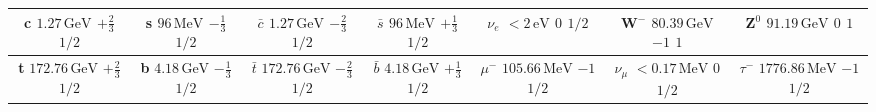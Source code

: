 \documentclass[letterpaper]{article}
\begin{document}
\begin{center}
\begin{tabular}{|c|c|c|c|c|c|c|}
\parbox[c][5em][c]{2cm}{\centering \textbf{c} \\ $1.27\,\text{GeV}$ \\ $+\frac{2}{3}$ \\ $1/2$} &
\parbox[c][5em][c]{2cm}{\centering \textbf{s} \\ $96\,\text{MeV}$ \\ $-\frac{1}{3}$ \\ $1/2$} &
\parbox[c][5em][c]{2cm}{\centering \textbf{$\bar{c}$} \\ $1.27\,\text{GeV}$ \\ $-\frac{2}{3}$ \\ $1/2$} &
\parbox[c][5em][c]{2cm}{\centering \textbf{$\bar{s}$} \\ $96\,\text{MeV}$ \\ $+\frac{1}{3}$ \\ $1/2$} &
\parbox[c][5em][c]{2cm}{\centering \textbf{$\nu_e$} \\ $<2\,\text{eV}$ \\ $0$ \\ $1/2$} &
\parbox[c][5em][c]{2cm}{\centering \textbf{W$^-$} \\ $80.39\,\text{GeV}$ \\ $-1$ \\ $1$} &
\parbox[c][5em][c]{2cm}{\centering \textbf{Z$^0$} \\ $91.19\,\text{GeV}$ \\ $0$ \\ $1$} \\ \hline

\parbox[c][5em][c]{2cm}{\centering \textbf{t} \\ $172.76\,\text{GeV}$ \\ $+\frac{2}{3}$ \\ $1/2$} &
\parbox[c][5em][c]{2cm}{\centering \textbf{b} \\ $4.18\,\text{GeV}$ \\ $-\frac{1}{3}$ \\ $1/2$} &
\parbox[c][5em][c]{2cm}{\centering \textbf{$\bar{t}$} \\ $172.76\,\text{GeV}$ \\ $-\frac{2}{3}$ \\ $1/2$} &
\parbox[c][5em][c]{2cm}{\centering \textbf{$\bar{b}$} \\ $4.18\,\text{GeV}$ \\ $+\frac{1}{3}$ \\ $1/2$} &
\parbox[c][5em][c]{2cm}{\centering \textbf{$\mu^-$} \\ $105.66\,\text{MeV}$ \\ $-1$ \\ $1/2$} &
\parbox[c][5em][c]{2cm}{\centering \textbf{$\nu_\mu$} \\ $<0.17\,\text{MeV}$ \\ $0$ \\ $1/2$} &
\parbox[c][5em][c]{2cm}{\centering \textbf{$\tau^-$} \\ $1776.86\,\text{MeV}$ \\ $-1$ \\ $1/2$}\\ \hline


\end{tabular}
\end{center}
\end{document}
